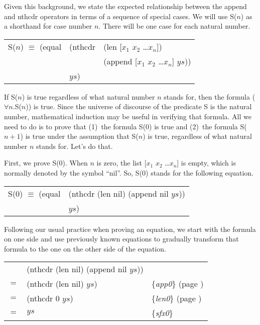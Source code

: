 Given this background, we state the expected relationship
between the append and nthcdr operators in terms of a sequence of special cases.
We will use S($n$) as a shorthand for case number $n$.
There will be one case for each natural number.

\begin{samepage}
\begin{center}
\begin{tabular}{lll}
S($n$) $\equiv$ (equal & (nthcdr & (len [$x_1$ $x_2$ \dots $x_n$])          \\
                       &         & (append [$x_1$ $x_2$ \dots $x_n$] $ys$)) \\
                       & $ys$)   &                                          \\
\end{tabular}
\end{center}
\end{samepage}

If S($n$) is true regardless of what natural number $n$ stands for,
then the formula ($\forall$$n$.S($n$)) is true.
Since the universe of discourse of the predicate S is the natural number,
mathematical induction may be useful in verifying that formula.
All we need to do is to prove that
(1)~the formula S(0) is true and
(2)~the formula S($n+1$) is true under the assumption that S($n$) is true,
regardless of what natural number $n$ stands for. Let's do that.

First, we prove S(0).
When $n$ is zero, the list [$x_1$ $x_2$ \dots $x_n$] is empty,
which is normally denoted by the symbol ``nil''.
So, S(0) stands for the following equation.

\begin{samepage}
\begin{center}
\begin{tabular}{ll}
S(0) $\equiv$ (equal & (nthcdr (len nil) (append nil $ys$)) \\
                     & $ys$)                                \\
\end{tabular}
\end{center}
\end{samepage}

Following our usual practice when proving an equation, we start with the formula on one side and use previously known equations to gradually transform that formula to the one on the other side of the equation.

\begin{center}
\begin{tabular}{lll}
    & (nthcdr (len nil) (append nil $ys$))  &                                                      \\
$=$ & (nthcdr (len nil) $ys$)               & \{\emph{app0}\} (page \pageref{append-equations})\\
$=$ & (nthcdr 0 $ys$)                       & \{\emph{len0}\} (page \pageref{len-equations})   \\
$=$ & $ys$                                  & \{\emph{sfx0}\}                                      \\
\end{tabular}
\end{center}

